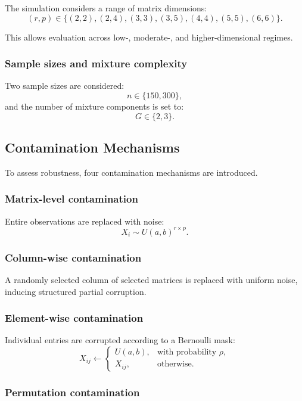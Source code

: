\documentclass[11pt]{article}
\begin{document}
The simulation considers a range of matrix dimensions:
\[
(r,p) \in \{(2,2), (2,4), (3,3), (3,5), (4,4), (5,5), (6,6)\}.
\]

This allows evaluation across low-, moderate-, and higher-dimensional regimes.

\subsubsection{Sample sizes and mixture complexity}

Two sample sizes are considered:
\[
n \in \{150, 300\},
\]
and the number of mixture components is set to:
\[
G \in \{2,3\}.
\]

\subsection{Contamination Mechanisms}

To assess robustness, four contamination mechanisms are introduced.

\subsubsection{Matrix-level contamination}

Entire observations are replaced with noise:
\[
X_i \sim U(a,b)^{r \times p}.
\]

\subsubsection{Column-wise contamination}

A randomly selected column of selected matrices is replaced with uniform noise, inducing structured partial corruption.

\subsubsection{Element-wise contamination}

Individual entries are corrupted according to a Bernoulli mask:
\[
X_{ij} \leftarrow
\begin{cases}
U(a,b), & \text{with probability } \rho, \\
X_{ij}, & \text{otherwise}.
\end{cases}
\]

\subsubsection{Permutation contamination}
\end{document}

